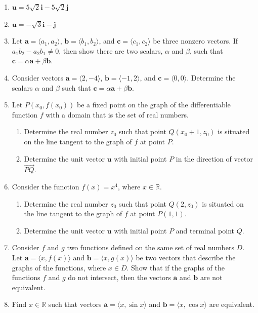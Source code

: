 \documentclass{exercises}
\begin{document}
\begin{enumerate}[resume]
\item $\mathbf{u}=5\sqrt{2}\mathbf{i}-5\sqrt{2}\mathbf{j}$
\item $\mathbf{u}=-\sqrt{3}\mathbf{i}-\mathbf{j}$
\item Let $\mathbf{a}=\langle a_{1},a_{2}\rangle$, $\mathbf{b}=\langle b_{1},b_{2}\rangle$, and $\mathbf{c}=\langle c_{1},c_{2}\rangle$ be three nonzero vectors. If $a_{1}b_{2}-a_{2}b_{1}\ne0$, then show there are two scalars, $\alpha$ and $\beta$, such that $\mathbf{c}=\alpha \mathbf{a}+\beta \mathbf{b}$.
\item Consider vectors $\mathbf{a}=\langle2,-4\rangle$, $\mathbf{b}=\langle-1,2\rangle$, and $\mathbf{c}=\langle0,0\rangle$. Determine the scalars $\alpha$ and $\beta$ such that $\mathbf{c}=\alpha \mathbf{a}+\beta \mathbf{b}$.
\item Let $P(x_{0},f(x_{0}))$ be a fixed point on the graph of the differentiable function $f$ with a domain that is the set of real numbers.
\begin{enumerate}[label=(\alph*)]
  \item Determine the real number $z_{0}$ such that point $Q(x_{0}+1,z_{0})$ is situated on the line tangent to the graph of $f$ at point $P$.
  \item Determine the unit vector $\mathbf{u}$ with initial point $P$ in the direction of vector $\overset{\to}{PQ}$.
\end{enumerate}
\item Consider the function $f(x)=x^{4}$, where $x\in \mathbb{R}$.
\begin{enumerate}[label=(\alph*)]
  \item Determine the real number $z_{0}$ such that point $Q(2,z_{0})$ is situated on the line tangent to the graph of $f$ at point $P(1,1)$.
  \item Determine the unit vector $\mathbf{u}$ with initial point $P$ and terminal point $Q$.
\end{enumerate}
\item Consider $f$ and $g$ two functions defined on the same set of real numbers $D$. Let $\mathbf{a}=\langle x,f(x)\rangle$ and $\mathbf{b}=\langle x,g(x)\rangle$ be two vectors that describe the graphs of the functions, where $x\in D$. Show that if the graphs of the functions $f$ and $g$ do not intersect, then the vectors $\mathbf{a}$ and $\mathbf{b}$ are not equivalent.
\item Find $x\in \mathbb{R}$ such that vectors $\mathbf{a}=\langle x,\sin x\rangle$ and $\mathbf{b}=\langle x,\cos x\rangle$ are equivalent.

\end{enumerate}
\end{document}
